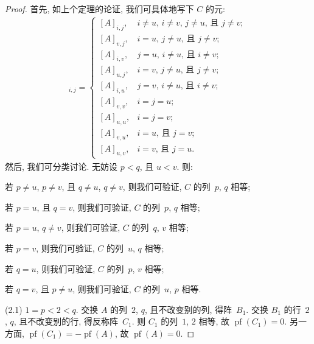 \documentclass[../libro.tex]{subfiles}
\begin{document}
\begin{proof}
    首先, 如上个定理的论证,
    我们可具体地写下 \(C\) 的元:
    \begin{align*}
        [C]_{i,j} =
        \begin{cases}
            [A]_{i,j},
            &
            \text{\(i \neq u\), \(i \neq v\), \(j \neq u\),
            且 \(j \neq v\)};
            \\
            [A]_{v,j},
            &
            \text{\(i = u\), \(j \neq u\), 且 \(j \neq v\)};
            \\
            [A]_{i,v},
            &
            \text{\(j = u\), \(i \neq u\), 且 \(i \neq v\)};
            \\
            [A]_{u,j},
            &
            \text{\(i = v\), \(j \neq u\), 且 \(j \neq v\)};
            \\
            [A]_{i,u},
            &
            \text{\(j = v\), \(i \neq u\), 且 \(i \neq v\)};
            \\
            [A]_{v,v},
            &
            \text{\(i = j = u\)};
            \\
            [A]_{u,u},
            &
            \text{\(i = j = v\)};
            \\
            [A]_{v,u},
            &
            \text{\(i = u\), 且 \(j = v\)};
            \\
            [A]_{u,v},
            &
            \text{\(i = v\), 且 \(j = u\)}.
        \end{cases}
    \end{align*}
    然后, 我们可分类讨论.
    无妨设 \(p < q\), 且 \(u < v\).
    则:

    若 \(p \neq u\), \(p \neq v\),
    且 \(q \neq u\), \(q \neq v\),
    则我们可验证, \(C\) 的列~\(p\), \(q\) 相等;

    若 \(p = u\), 且 \(q = v\),
    则我们可验证, \(C\) 的列~\(p\), \(q\) 相等;

    若 \(p = u\), \(q \neq v\),
    则我们可验证, \(C\) 的列~\(q\), \(v\) 相等;

    若 \(p = v\),
    则我们可验证, \(C\) 的列~\(u\), \(q\) 相等;

    若 \(q = u\),
    则我们可验证, \(C\) 的列~\(p\), \(v\) 相等;

    若 \(q = v\), 且 \(p \neq u\),
    则我们可验证, \(C\) 的列~\(u\), \(p\) 相等.

    (2.1)
    \(1 = p < 2 < q\).
    交换 \(A\) 的列~\(2\), \(q\), 且不改变别的列, 得阵~\(B_1\).
    交换 \(B_1\) 的行~\(2\), \(q\), 且不改变别的行,
    得反称阵~\(C_1\).
    则 \(C_1\) 的列~\(1\), \(2\) 相等,
    故 \(\operatorname{pf} {(C_1)} = 0\).
    另一方面, \(\operatorname{pf} {(C_1)}
    = -\operatorname{pf} {(A)}\),
    故 \(\operatorname{pf} {(A)} = 0\).


\end{proof}
\end{document}
